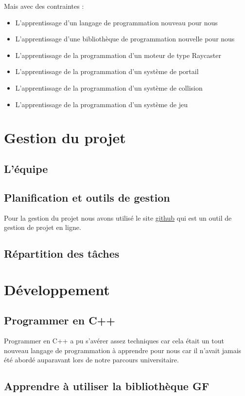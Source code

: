 \documentclass[12pt]{report}
\begin{document}
Mais avec des contraintes :
\begin{itemize}
	\item L'apprentissage d'un langage de programmation nouveau pour nous
	\item L'apprentissage d'une bibliothèque de programmation nouvelle pour nous
	\item L'apprentissage de la programmation d'un moteur de type Raycaster
	\item L'apprentissage de la programmation d'un système de portail
	\item L'apprentissage de la programmation d'un système de collision
	\item L'apprentissage de la programmation d'un système de jeu
\end{itemize}

\section{Gestion du projet}
\subsection{L'équipe}
\subsection{Planification et outils de gestion}

Pour la gestion du projet nous avons utilisé le site \href{https://github.com/}{github} qui est un outil de gestion de projet en ligne.

\subsection{Répartition des tâches}

\section{Développement}
\subsection{Programmer en C++}

Programmer en C++ a pu s'avérer assez techniques car cela était un tout nouveau langage de programmation à apprendre pour nous car il n'avait jamais été abordé auparavant lors de notre parcours universitaire.

\subsection{Apprendre à utiliser la bibliothèque GF}
\end{document}

